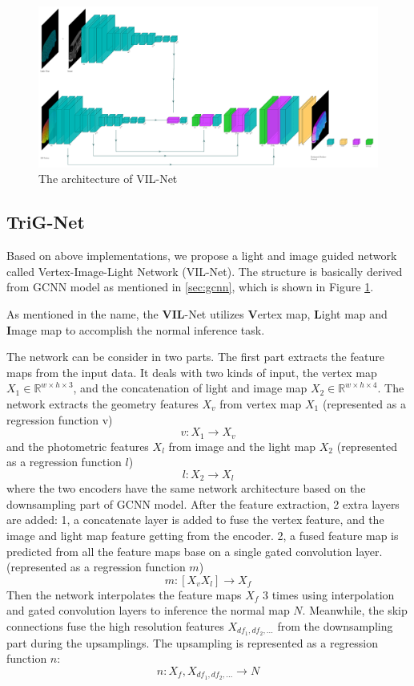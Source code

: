 \documentclass[border=15pt, multi, tikz]{article}
\begin{document}
\begin{figure}
	\centering
	\includegraphics[width=1\textwidth]{Figures/vil-net} %
	\caption{The architecture of VIL-Net}
	\label{fig:VIL-Net}
\end{figure}


\subsection{TriG-Net}


Based on above implementations, we propose a light and image guided network called Vertex-Image-Light Network (VIL-Net). The structure is basically derived from GCNN model as mentioned in \ref{sec:gcnn}, which is shown in Figure 
\ref{fig:VIL-Net}.

As mentioned in the name, the \textbf{VIL}-Net utilizes \textbf{V}ertex map, \textbf{L}ight map and \textbf{I}mage map to accomplish the normal inference task. 

The network can be consider in two parts. The first part extracts the feature maps from the input data. It deals with two kinds of input, the vertex map $ X_1 \in \mathbb{R}^{w\times h\times3}$, and the concatenation of light and image map $ X_2 \in \mathbb{R}^{w\times h\times4} $. The network extracts the geometry features $ X_v $ from vertex map $ X_1 $ (represented as a regression function v)
\[ v: X_1 \rightarrow X_v \]
and the photometric features $ X_l $ from image and the light map $ X_2 $ (represented as a regression function $ l $)
\[ l: X_2 \rightarrow X_l \]
where the two encoders have the same network architecture based on the downsampling part of GCNN model. After the feature extraction, 2 extra layers are added: 1, a concatenate layer is added to fuse the vertex feature, and the image and light map feature getting from the encoder. 
2, a fused feature map is predicted from all the feature maps base on a single gated convolution layer. (represented as a regression function $ m $)
\[ m: [X_v X_l] \rightarrow X_f \]
Then the network interpolates the feature maps $ X_f $ 3 times using interpolation and gated convolution layers to inference the normal map $ N $. Meanwhile, the skip connections fuse the high resolution features $ X_{df_1, df_2, ...} $ from the downsampling part during the upsamplings. The upsampling is represented as a regression function $ n $:
\[ n: X_f, X_{df_1, df_2, ...} \rightarrow N \]
\end{document}
